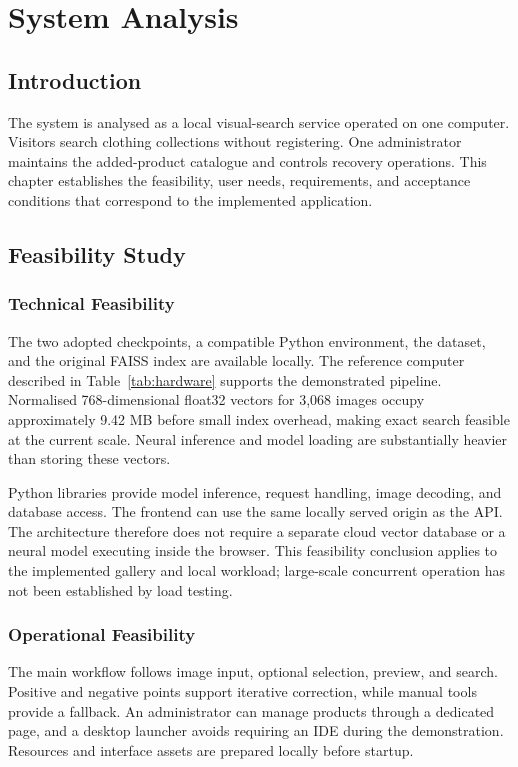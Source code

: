 \chapter{System Analysis}
\label{ch:analysis}

\section{Introduction}
The system is analysed as a local visual-search service operated on one computer.
Visitors search clothing collections without registering. One administrator
maintains the added-product catalogue and controls recovery operations. This
chapter establishes the feasibility, user needs, requirements, and acceptance
conditions that correspond to the implemented application.

\section{Feasibility Study}
\subsection{Technical Feasibility}
The two adopted checkpoints, a compatible Python environment, the dataset, and
the original FAISS index are available locally. The reference computer described
in Table~\ref{tab:hardware} supports the demonstrated pipeline. Normalised
768-dimensional float32 vectors for 3,068 images occupy approximately 9.42 MB
before small index overhead, making exact search feasible at the current scale.
Neural inference and model loading are substantially heavier than storing these
vectors.

Python libraries provide model inference, request handling, image decoding, and
database access. The frontend can use the same locally served origin as the API.
The architecture therefore does not require a separate cloud vector database or
a neural model executing inside the browser. This feasibility conclusion applies
to the implemented gallery and local workload; large-scale concurrent operation
has not been established by load testing.

\subsection{Operational Feasibility}
The main workflow follows image input, optional selection, preview, and search.
Positive and negative points support iterative correction, while manual tools
provide a fallback. An administrator can manage products through a dedicated
page, and a desktop launcher avoids requiring an IDE during the demonstration.
Resources and interface assets are prepared locally before startup.

